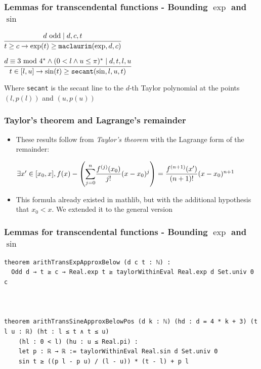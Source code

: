 \documentclass[usepdftitle=false,aspectratio=169,usenames,dvipsnames]{beamer}
\newcommand\vitem{\vfill\item}
\begin{document}
\begin{frame}[fragile]
  \frametitle{Lemmas for transcendental functions - Bounding $\exp$ and $\sin$}
\begin{center}
$\infer[]{t \geq c \rightarrow \exp(t) \geq \texttt{maclaurin}(\exp, d, c)}{d \text{ odd} \mid d,c,t}$
\end{center}

\vspace{15pt}

\begin{center}
  $\infer[]{t \in [l, u] \rightarrow
  \sin(t) \geq \texttt{secant}(\sin, l, u, t)}{d \equiv 3 \text{ mod $4^*$} \wedge (0 < l \wedge u \le \pi)^* \mid d,t,l,u}$
\end{center}

\vspace{15pt}

Where \texttt{secant} is the secant line to the $d$-th Taylor polynomial at the points $(l, p(l))$ and $(u, p(u))$

\end{frame}

\begin{frame}
  \frametitle{Taylor's theorem and Lagrange's remainder}
  \begin{itemize}
    \item These results follow from \textit{Taylor's theorem} with the Lagrange form of the remainder:

    \vfill
    \begin{center}
      $\exists x' \in [x_0, x], f(x) - \left( \mathlarger{\sum_{j=0}^{n}}\dfrac{f^{(j)}(x_0)}{j!}(x - x_0)^j \right) = \dfrac{f^{(n+1)}(x')}{(n+1)!}(x - x_0)^{n+1}$
    \end{center}
    \pause
          \vitem This formula already existed in mathlib,
          but with the additional hypothesis that $x_0 < x$. We extended it to the general version
  \end{itemize}
\end{frame}

\begin{frame}[fragile]
  \frametitle{Lemmas for transcendental functions - Bounding $\exp$ and $\sin$}
\begin{lstlisting}
theorem arithTransExpApproxBelow (d c t : ℕ) :
  Odd d → t ≥ c → Real.exp t ≥ taylorWithinEval Real.exp d Set.univ 0 c



theorem arithTransSineApproxBelowPos (d k : ℕ) (hd : d = 4 * k + 3) (t l u : ℝ) (ht : l ≤ t ∧ t ≤ u)
    (hl : 0 < l) (hu : u ≤ Real.pi) :
    let p : ℝ → ℝ := taylorWithinEval Real.sin d Set.univ 0
    sin t ≥ ((p l - p u) / (l - u)) * (t - l) + p l
\end{lstlisting}
\end{frame}
\end{document}
